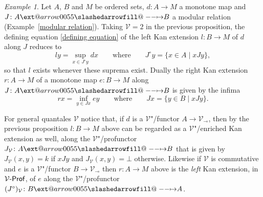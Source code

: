\documentclass[preprint, a4paper]{elsarticle}
\makeatletter
\def\slashedarrowfill@#1#2#3#4#5{%
  $\m@th\thickmuskip0mu\medmuskip\thickmuskip\thinmuskip\thickmuskip
   \relax#5#1\mkern-7mu%
   \cleaders\hbox{$#5\mkern-2mu#2\mkern-2mu$}\hfill
   \mathclap{#3}\mathclap{#2}%
   \cleaders\hbox{$#5\mkern-2mu#2\mkern-2mu$}\hfill
   \mkern-7mu#4$%
}
\def\rightslashedarrowfill@{%
  \slashedarrowfill@\relbar\relbar\mapstochar\rightarrow}
\newcommand\xslashedrightarrow[2][]{%
  \ext@arrow 0055{\rightslashedarrowfill@}{#1}{#2}}
\def\slashedrightarrow{\xslashedrightarrow{}}
\newcommand{\dashcirc}{\multimap}
\theoremstyle{definition}
\theoremstyle{remark}
\newtheorem{example}[theorem]{Example}
\providecommand{\exref}[1]{Example~\ref{#1}}
\providecommand{\brcs}[1]{\lbrace #1 \rbrace}
\providecommand{\set}[1]{\brcs{#1}}
\providecommand{\rev}[1]{#1^\circ}
\providecommand{\map}[3]{#1\colon#2\to#3}
\providecommand{\hmap}[3]{#1\colon#2\slashedrightarrow#3}
\providecommand{\catvar}[1]{\mathcal{#1}}
\providecommand{\2}{\mathsf 2}
\providecommand{\V}{\catvar V}
\providecommand{\Prof}{\mathsf{Prof}}
\providecommand{\enProf}[1]{#1\text-\Prof}
\makeatother
\begin{document}
  \begin{example} \label{Kan extensions in ordered sets}
  	Let $A$, $B$ and $M$ be ordered sets, $\map dAM$ a monotone map and $\hmap JAB$ a modular relation (\exref{modular relation}). Taking $\V = 2$ in the previous proposition, the defining equation \eqref{defining equation} of the left Kan extension $\map lBM$ of $d$ along $J$ reduces to
  	\begin{displaymath}
  		ly = \sup_{x \in \rev Jy} dx \qquad \text{where} \qquad \rev Jy = \set{x \in A \mid xJy},
  	\end{displaymath}
  	so that $l$ exists whenever these suprema exist. Dually the right Kan extension $\map rAM$ of a monotone map $\map eBM$ along $\hmap JAB$ is given by the infima
  	\begin{displaymath}
  		rx = \inf_{y \in Jx} ey \qquad \text{where} \qquad Jx = \set{y \in B \mid xJy}.
  	\end{displaymath}
  	
  	For general quantales $\V$ notice that, if $d$ is a $\V$"/functor $A \to \V_{\dashcirc}$, then by the previous proposition $\map lBM$ above can be regarded as a $\V$"/enriched Kan extension as well, along the $\V$"/profunctor $\hmap{J_\V}AB$ that is given by $J_\V(x,y) = k$ if $xJy$ and $J_\V(x,y) = \bot$ otherwise. Likewise if $\V$ is commutative and $e$ is a $\V$"/functor $B \to \V_{\dashcirc}$ then $\map rAM$ above is the \emph{left} Kan extension, in $\enProf\V$, of $e$ along the $\V$"/profunctor $\hmap{(\rev J)_\V}BA$.
  \end{example}
  
\end{document}
